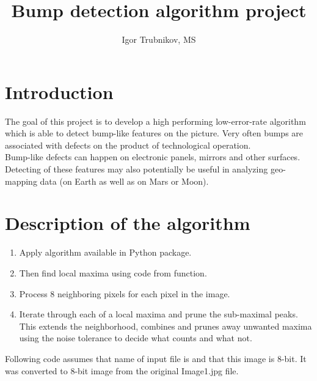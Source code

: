 \documentclass[letterpaper, 14pt]{article}
\title{Bump detection algorithm project}
\author{Igor Trubnikov, MS}
\begin{document}
\maketitle
\tableofcontents
\newpage

\section{Introduction}
The goal of this project is to develop a high performing low-error-rate algorithm which is able to detect bump-like features on the picture. Very often bumps are associated with defects on the product of technological operation.\\
Bump-like defects can happen on electronic panels, mirrors and other surfaces.\\
Detecting of these features may also potentially be useful in analyzing geo-mapping data (on Earth as well as on Mars or Moon).\\

\newpage

\section{Description of the algorithm}

\begin{enumerate}
	\item Apply  algorithm available in Python  package.
	\item Then find local maxima using code from  function.
	\item Process 8 neighboring pixels for each pixel in the image.
	\item Iterate through each of a local maxima and prune the sub-maximal peaks.\\
	This extends the neighborhood, combines and prunes away unwanted maxima using the noise tolerance to decide what counts and what not.
\end{enumerate}

Following code assumes that name of input file is  and that this image is 8-bit. It was converted to 8-bit image from the original Image1.jpg file.

\newpage
\end{document}
